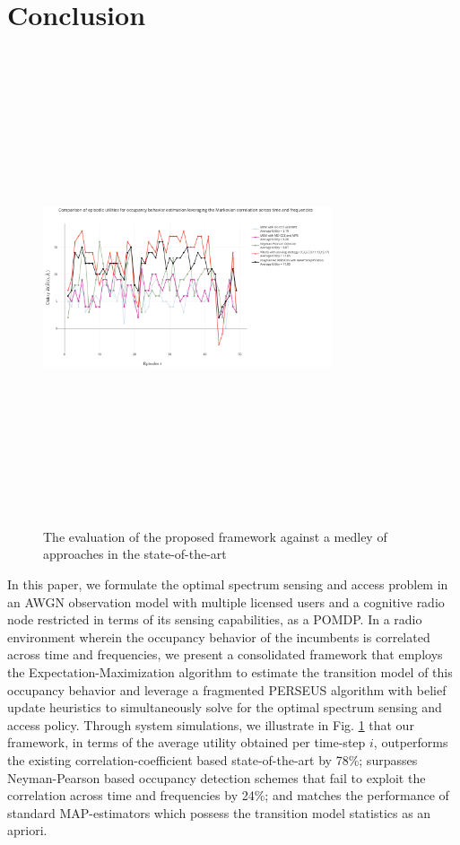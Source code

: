 \documentclass[10pt,twocolumn]{IEEEtran}
\begin{document}
\section{Conclusion}\label{V}
\begin{figure}
    \centering
    \includegraphics[width=8.5cm,height=14cm,keepaspectratio]{ComparisonWithSoA.png}
    \caption{The evaluation of the proposed framework against a medley of approaches in the state-of-the-art}
    \label{fig:7}
\end{figure}
In this paper, we formulate the optimal spectrum sensing and access problem in an AWGN observation model with multiple licensed users and a cognitive radio node restricted in terms of its sensing capabilities, as a POMDP. In a radio environment wherein the occupancy behavior of the incumbents is correlated across time and frequencies, we present a consolidated framework that employs the Expectation-Maximization algorithm to estimate the transition model of this occupancy behavior and leverage a fragmented PERSEUS algorithm with belief update heuristics to simultaneously solve for the optimal spectrum sensing and access policy. Through system simulations, we illustrate in Fig. \ref{fig:7} that our framework, in terms of the average utility obtained per time-step $i$, outperforms the existing correlation-coefficient based state-of-the-art by 78\%; surpasses Neyman-Pearson based occupancy detection schemes that fail to exploit the correlation across time and frequencies by 24\%; and matches the performance of standard MAP-estimators which possess the transition model statistics as an apriori.


\end{document}
